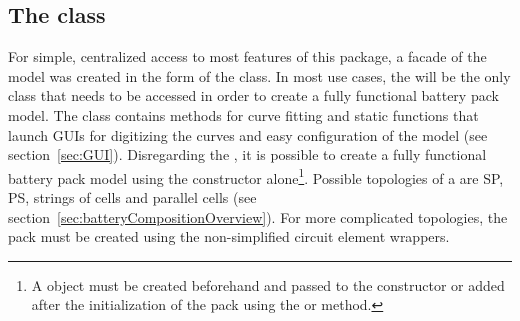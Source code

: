 \subsection{The  class}
\label{sec:batteryPack}
For simple, centralized access to most features of this package, a facade of the model was created in the form of the  class. In most use cases, the  will be the only class that needs to be accessed in order to create a fully functional battery pack model. The class contains methods for curve fitting and static functions that launch GUIs for digitizing the curves and easy configuration of the model (see section~\ref{sec:GUI}). Disregarding the , it is possible to create a fully functional battery pack model using the  constructor alone\footnote{A  object must be created beforehand and passed to the constructor or added after the initialization of the pack using the  or  method.}. Possible topologies of a  are SP, PS, strings of cells and parallel cells (see section~\ref{sec:batteryCompositionOverview}). For more complicated topologies, the pack must be created using the non-simplified circuit element wrappers. 

